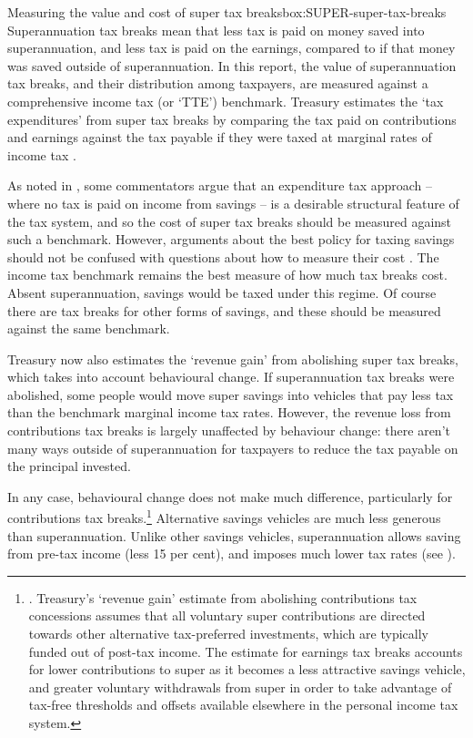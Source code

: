 \documentclass{grattanAlpha}
\begin{document}
\begin{smallbox}[tp]{Measuring the value and cost of super tax breaks}{box:SUPER-super-tax-breaks}
Superannuation tax breaks mean that less tax is paid on money saved into superannuation, and less tax is paid on the earnings, compared to if that money was saved outside of superannuation. In this report, the value of superannuation tax breaks, and their distribution among taxpayers, are measured against a comprehensive income tax (or ‘TTE’) benchmark. Treasury estimates the ‘tax expenditures’ from super tax breaks by comparing the tax paid on contributions and earnings against the tax payable if they were taxed at marginal rates of income tax \textcite{Treasury2015TES2014}. 

As noted in , some commentators argue that an expenditure tax approach – where no tax is paid on income from savings – is a desirable structural feature of the tax system, and so the cost of super tax breaks should be measured against such a benchmark. However, arguments about the best policy for taxing savings should not be confused with questions about how to measure their cost \textcite{DaleyWoodCoates2015}. The income tax benchmark remains the best measure of how much tax breaks cost. Absent superannuation, savings would be taxed under this regime. Of course there are tax breaks for other forms of savings, and these should be measured against the same benchmark. 

Treasury now also estimates the ‘revenue gain’ from abolishing super tax breaks, which takes into account behavioural change. If superannuation tax breaks were abolished, some people would move super savings into vehicles that pay less tax than the benchmark marginal income tax rates. However, the revenue loss from contributions tax breaks is largely unaffected by behaviour change: there aren’t many ways outside of superannuation for taxpayers to reduce the tax payable on the principal invested. 
\end{smallbox}

In any case, behavioural change does not make much difference, particularly for contributions tax breaks.\footnote{\textcite[][124]{Treasury2015TES2014}. Treasury’s ‘revenue gain’ estimate from abolishing contributions tax concessions assumes that all voluntary super contributions are directed towards other alternative tax-preferred investments, which are typically funded out of post-tax income. The estimate for earnings tax breaks accounts for lower contributions to super as it becomes a less attractive savings vehicle, and greater voluntary withdrawals from super in order to take advantage of tax-free thresholds and offsets available elsewhere in the personal income tax system.}  
Alternative savings vehicles are much less generous than superannuation. Unlike other savings vehicles, superannuation allows saving from pre-tax income (less 15 per cent), and imposes much lower tax rates (see ). 
\end{document}

